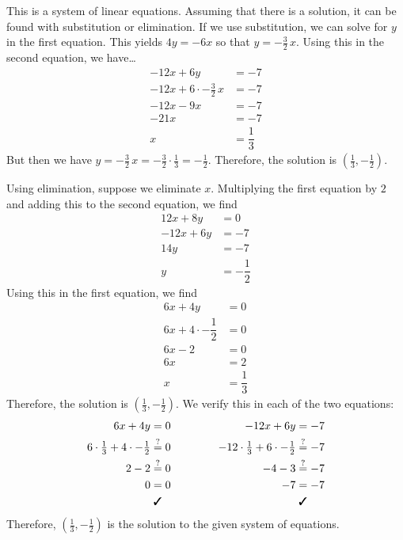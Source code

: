 \documentclass[11pt,letterpaper]{article}
\begin{document}
\sol This is a system of linear equations. Assuming that there is a solution, it can be found with substitution or elimination. If we use substitution, we can solve for $y$ in the first equation. This yields $4y= -6x$ so that $y= -\frac{3}{2}\,x$. Using this in the second equation, we have\dots
	\[
	\begin{aligned}
	-12x + 6y&= -7 \\
	-12x + 6 \cdot -\frac{3}{2}\,x&= -7 \\
	-12x - 9x&= -7 \\
	-21x&= -7 \\
	x&= \dfrac{1}{3}
	\end{aligned}
	\]
But then we have $y= -\frac{3}{2}\,x= -\frac{3}{2} \cdot \frac{1}{3}= -\frac{1}{2}$. Therefore, the solution is $(\frac{1}{3}, -\frac{1}{2})$. \pspace

Using elimination, suppose we eliminate $x$. Multiplying the first equation by $2$ and adding this to the second equation, we find
	\[
	\begin{aligned}
	12x + 8y&= 0 \\
	-12x + 6y&= -7 \\ \hline
	14y&= -7 \\
	y&= -\dfrac{1}{2}
	\end{aligned}
	\] 
Using this in the first equation, we find
	\[
	\begin{aligned}
	6x + 4y&= 0 \\
	6x + 4 \cdot -\dfrac{1}{2}&= 0 \\
	6x - 2&= 0 \\
	6x&= 2 \\
	x&= \dfrac{1}{3}
	\end{aligned}
	\]
Therefore, the solution is $(\frac{1}{3}, -\frac{1}{2})$. We verify this in each of the two equations: 
	\[
	\begin{aligned}
	6x + 4y&= 0 &\hspace{2cm} -12x + 6y&= - 7 \\
	6 \cdot \tfrac{1}{3} + 4 \cdot -\tfrac{1}{2}&\stackrel{?}{=} 0 & -12 \cdot \tfrac{1}{3} + 6 \cdot -\tfrac{1}{2}&\stackrel{?}{=} -7 \\
	2 - 2&\stackrel{?}{=} 0 & -4 - 3&\stackrel{?}{=} -7 \\
	0&= 0 & -7&= -7 \\
	&\text{\;\cmark} & &\text{\;\cmark}
	\end{aligned}
	\]
Therefore, $(\frac{1}{3}, -\frac{1}{2})$ is the solution to the given system of equations. 
\end{document}
